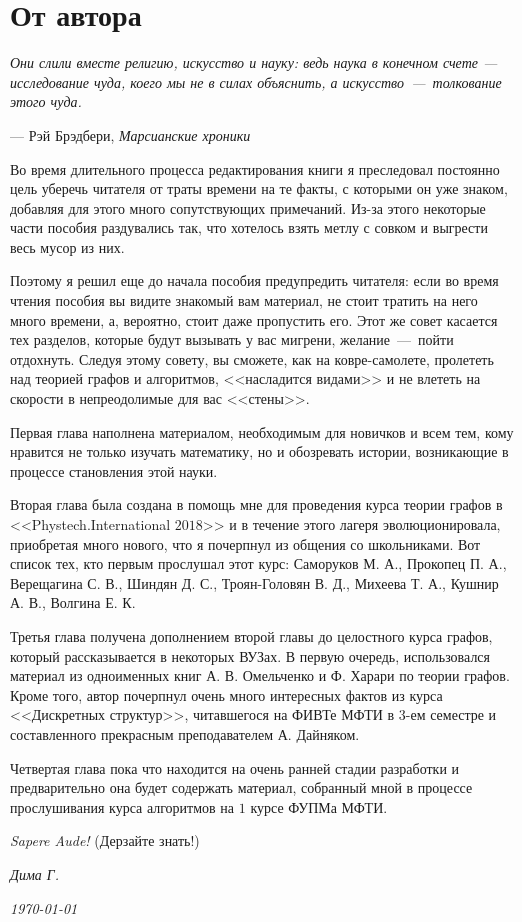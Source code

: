 \sloppy
\chapter*{От автора}

\epigraph{\itshape Они слили вместе религию, искусство и науку: 
ведь наука в конечном счете --- исследование чуда, коего мы не в силах объяснить,
а искусство~---~толкование этого чуда.}{--- Рэй Брэдбери, \textit{Марсианские хроники}}

	Во время длительного процесса редактирования книги я преследовал постоянно цель 
	уберечь читателя от траты времени на те факты, с которыми он уже знаком, добавляя для этого много сопутствующих примечаний. 
	Из-за этого некоторые части пособия раздувались так, что хотелось взять метлу с совком и выгрести весь мусор из них. 
	
	Поэтому я решил еще до начала пособия предупредить читателя: если во время чтения пособия 
	вы видите знакомый вам материал, не стоит тратить на него много времени, а, вероятно, стоит даже пропустить его. 
	Этот же совет касается тех разделов, которые будут вызывать у вас мигрени, желание~---~пойти отдохнуть. 
	Следуя этому совету, вы сможете, как на ковре-самолете, пролететь над теорией графов и алгоритмов, 
	<<насладится видами>> и не влететь на скорости в непреодолимые для вас <<стены>>.
	
	Первая глава наполнена материалом, необходимым для новичков и всем тем, 
	кому нравится не только изучать математику, но и обозревать истории, возникающие в процессе становления этой науки.
	
	Вторая глава была создана в помощь мне для проведения курса теории графов в <<Phystech.International $2018$>> 
	и в течение этого лагеря эволюционировала, приобретая много нового, что я почерпнул из общения со школьниками.
	Вот список тех, кто первым прослушал этот курс: Саморуков М. А., Прокопец П. А., Верещагина С. В., Шиндян Д. С.,
	Троян-Головян В. Д., Михеева Т. А., Кушнир А. В., Волгина Е. К.
	
	Третья глава получена дополнением второй главы до целостного курса графов, который рассказывается в некоторых ВУЗах.
	В первую очередь, использовался материал из одноименных книг А. В. Омельченко и Ф. Харари по теории графов. Кроме того,
	автор почерпнул очень много интересных фактов из курса <<Дискретных структур>>, читавшегося на ФИВТе МФТИ в $3$-ем 
	семестре и составленного прекрасным преподавателем А. Дайняком.
	
	Четвертая глава пока что находится на очень ранней стадии разработки и предварительно она будет содержать материал, 
	собранный мной в процессе прослушивания курса алгоритмов на $1$ курсе ФУПМа МФТИ.
	
	\emph{Sapere Aude!} (Дерзайте знать!)

\begin{flushright}
\textit{Дима Г.}

\textit{\today}
\end{flushright}